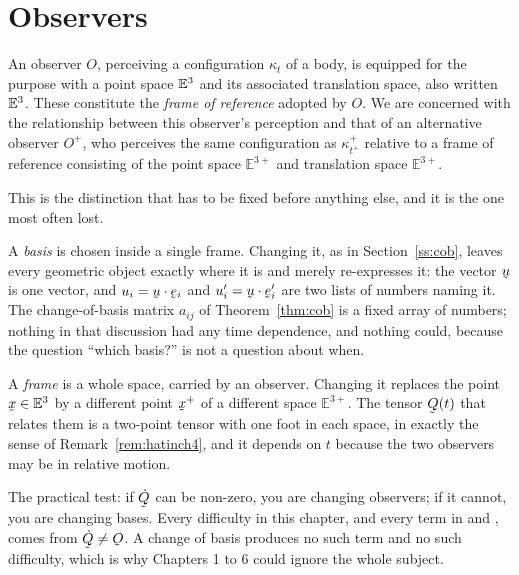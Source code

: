 \section{Observers}\label{sec:ch7obs}

An observer $O$, perceiving a configuration $\kappa_{t}$ of a body, is
equipped for the purpose with a point space $\mathbb{E}^{3}$ and its associated
translation space, also written $\mathbb{E}^{3}$. These constitute the \emph{frame
of reference} adopted by $O$. We are concerned with the relationship
between this observer's perception and that of an alternative observer
$O^{+}$, who perceives the same configuration as $\kappa^{+}_{t^{+}}$
relative to a frame of reference consisting of the point space
$\mathbb{E}^{3+}$ and translation space $\mathbb{E}^{3+}$.

\begin{remark}\label{rem:ch7frame}
This is the distinction that has to be fixed before anything else, and it
is the one most often lost.

A \emph{basis} is chosen inside a single frame. Changing it, as in
Section~\ref{ss:cob}, leaves every geometric object exactly where it is
and merely re-expresses it: the vector $\bu$ is one vector, and
$u_{i}=\ip\bu{\be_{i}}$ and $u_{i}'=\ip\bu{\be_{i}'}$ are two lists of
numbers naming it. The change-of-basis matrix $a_{ij}$ of
Theorem~\ref{thm:cob} is a fixed array of numbers; nothing in that
discussion had any time dependence, and nothing could, because the
question ``which basis?'' is not a question about when.

A \emph{frame} is a whole space, carried by an observer. Changing it
replaces the point $\bx\in\Et$ by a different point $\bx^{+}$ of a
different space $\mathbb{E}^{3+}$. The tensor $\bQ(t)$ that relates them
is a two-point tensor with one foot in each space, in exactly the sense
of Remark~\ref{rem:hatinch4}, and it depends on $t$ because the two
observers may be in relative motion.

The practical test: if $\dot\bQ$ can be non-zero, you are changing
observers; if it cannot, you are changing bases. Every difficulty in this
chapter, and every term in  and , comes from
$\dot\bQ\neq\Ob$. A change of basis produces no such term and no such
difficulty, which is why Chapters 1 to 6 could ignore the whole subject.
\end{remark}

